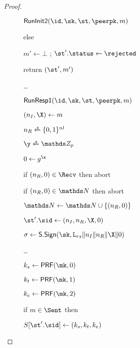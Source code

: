 \begin{proof}
\begin{figure}[tp]
\begin{minipage}[t]{0.49\textwidth}
\begin{oracle}{$\RunInit(\id,\sk,\st,\peerpk,m)$}
          \item else
          \item \hindent $m' \gets \bot$
          ; $\st'.\status \gets \rejected$
          \item return $(\st', m')$
        \else
          \item \dots
        \fi
        \end{oracle}
        \end{minipage}
        \begin{minipage}[t]{0.49\textwidth}
          \ExptSepSpace
        \begin{oracle}{$\RunRespI(\id,\sk,\st,\peerpk,m)$}
        \iffull
          \item $(\nonce_I,\X) \gets m$
          \item $\nonce_R \sample \bits^{\nl}$
          \item $\y \sample \ZZ_p$
          \item $\Y \gets g^{\x}$
          \item if $(\nonce_R, \Y) \in \Recv$ then abort
          \item if $(\nonce_R, \Y) \in \N$ then abort
          \item $\N \gets \N \cup \{(\nonce_R,\Y)\}$
          \item $\st'.\sid \gets (\nonce_I, \nonce_R,\X,\Y)$
          \item $\sigma \gets \SIGScheme.\SIGSign(\sk,\labelrs\|\nonce_I\|\nonce_R\|\X\|\Y)$
        \else
          \item \dots
        \fi
          \item \gamechange{$\mk\sample \bits^{\kl}$}
          \item {}
          \item \hindent {}
          \item \hindent \hindent {}
          \item \hindent {}
          \item $\ks \gets \PRF(\mk,0)$
          \item $\kt \gets \PRF(\mk,1)$
          \item $\ke \gets \PRF(\mk,2)$
          \item if $m \in \Sent$ then
          \item \hindent $\S[\st'.\sid] \gets (\ks,\kt,\ke)$

\end{oracle}
\end{minipage}
\end{figure}
\end{proof}
